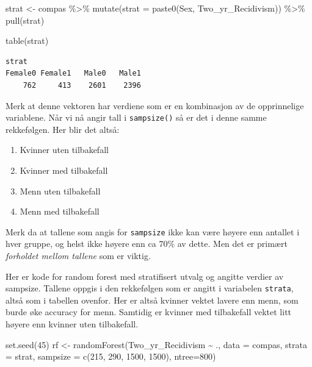 \documentclass[
  letterpaper,
  DIV=11,
  numbers=noendperiod]{scrreprt}
\newenvironment{Shaded}{\begin{snugshade}}{\end{snugshade}}
\newcommand{\AttributeTok}[1]{\textcolor[rgb]{0.40,0.45,0.13}{#1}}
\newcommand{\DecValTok}[1]{\textcolor[rgb]{0.68,0.00,0.00}{#1}}
\newcommand{\FunctionTok}[1]{\textcolor[rgb]{0.28,0.35,0.67}{#1}}
\newcommand{\NormalTok}[1]{\textcolor[rgb]{0.00,0.23,0.31}{#1}}
\newcommand{\OtherTok}[1]{\textcolor[rgb]{0.00,0.23,0.31}{#1}}
\newcommand{\SpecialCharTok}[1]{\textcolor[rgb]{0.37,0.37,0.37}{#1}}
\providecommand{\tightlist}{%
  \setlength{\itemsep}{0pt}\setlength{\parskip}{0pt}}
\begin{document}
\begin{Shaded}
\begin{Highlighting}[]
\NormalTok{strat }\OtherTok{\textless{}{-}}\NormalTok{ compas }\SpecialCharTok{\%\textgreater{}\%} 
  \FunctionTok{mutate}\NormalTok{(}\AttributeTok{strat =} \FunctionTok{paste0}\NormalTok{(Sex, Two\_yr\_Recidivism)) }\SpecialCharTok{\%\textgreater{}\%} 
  \FunctionTok{pull}\NormalTok{(strat)}

\FunctionTok{table}\NormalTok{(strat)}
\end{Highlighting}
\end{Shaded}

\begin{verbatim}
strat
Female0 Female1   Male0   Male1 
    762     413    2601    2396 
\end{verbatim}

Merk at denne vektoren har verdiene som er en kombinasjon av de
opprinnelige variablene. Når vi nå angir tall i \texttt{sampsize()} så
er det i denne samme rekkefølgen. Her blir det altså:

\begin{enumerate}
\def\labelenumi{\arabic{enumi})}
\tightlist
\item
  Kvinner uten tilbakefall
\item
  Kvinner med tilbakefall
\item
  Menn uten tilbakefall
\item
  Menn med tilbakefall
\end{enumerate}

Merk da at tallene som angis for \texttt{sampsize} ikke kan være høyere
enn antallet i hver gruppe, og helst ikke høyere enn ca 70\% av dette.
Men det er primært \emph{forholdet mellom tallene} som er viktig.

Her er kode for random forest med stratifisert utvalg og angitte verdier
av sampsize. Tallene oppgis i den rekkefølgen som er angitt i variabelen
\texttt{strata}, altså som i tabellen ovenfor. Her er altså kvinner
vektet lavere enn menn, som burde øke accuracy for menn. Samtidig er
kvinner med tilbakefall vektet litt høyere enn kvinner uten tilbakefall.

\begin{Shaded}
\begin{Highlighting}[]
\FunctionTok{set.seed}\NormalTok{(}\DecValTok{45}\NormalTok{)}
\NormalTok{rf }\OtherTok{\textless{}{-}} \FunctionTok{randomForest}\NormalTok{(Two\_yr\_Recidivism }\SpecialCharTok{\textasciitilde{}}\NormalTok{ .,}
                   \AttributeTok{data =}\NormalTok{ compas,}
                   \AttributeTok{strata =}\NormalTok{ strat, }
                   \AttributeTok{sampsize =} \FunctionTok{c}\NormalTok{(}\DecValTok{215}\NormalTok{, }\DecValTok{290}\NormalTok{, }\DecValTok{1500}\NormalTok{, }\DecValTok{1500}\NormalTok{), }
                   \AttributeTok{ntree=}\DecValTok{800}\NormalTok{)}
\end{Highlighting}
\end{Shaded}
\end{document}
